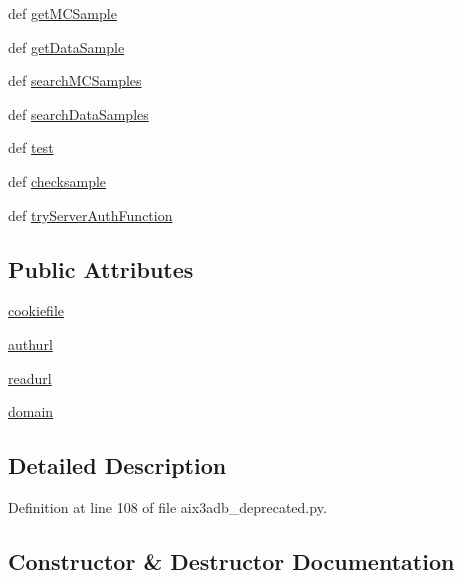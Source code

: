 \begin{DoxyCompactItemize}
\item 
def \hyperlink{classaix3adb__deprecated_1_1aix3adb_a8f12d1a43ee470116b062f897290d4c6}{get\-M\-C\-Sample}
\item 
def \hyperlink{classaix3adb__deprecated_1_1aix3adb_a0f34788c6db23908d08ae11dbfb2bfc4}{get\-Data\-Sample}
\item 
def \hyperlink{classaix3adb__deprecated_1_1aix3adb_ac3ec5ea0f57921411a94ad391ceee330}{search\-M\-C\-Samples}
\item 
def \hyperlink{classaix3adb__deprecated_1_1aix3adb_a0bf4b7cb55c37c80bb1d9ee81d0370bf}{search\-Data\-Samples}
\item 
def \hyperlink{classaix3adb__deprecated_1_1aix3adb_a6ad02de91c3d0b684964f90640f776a7}{test}
\item 
def \hyperlink{classaix3adb__deprecated_1_1aix3adb_af476d2c213a2be3ca8c556f4c2c41811}{checksample}
\item 
def \hyperlink{classaix3adb__deprecated_1_1aix3adb_a8485264e25b92d97c964786282453a74}{try\-Server\-Auth\-Function}
\end{DoxyCompactItemize}
\subsection*{Public Attributes}
\begin{DoxyCompactItemize}
\item 
\hyperlink{classaix3adb__deprecated_1_1aix3adb_af033ccecd5302312bf229a940130681c}{cookiefile}
\item 
\hyperlink{classaix3adb__deprecated_1_1aix3adb_a209888746b3f38a2eb924850a36fa81e}{authurl}
\item 
\hyperlink{classaix3adb__deprecated_1_1aix3adb_a7d22b98dfb97d1a16a75189765efea2c}{readurl}
\item 
\hyperlink{classaix3adb__deprecated_1_1aix3adb_a71fa095d2699a77af3fc32196db3c265}{domain}
\end{DoxyCompactItemize}


\subsection{Detailed Description}


Definition at line 108 of file aix3adb\-\_\-deprecated.\-py.



\subsection{Constructor \& Destructor Documentation}
